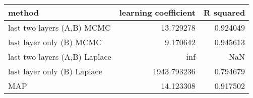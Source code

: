 \begin{tabular}{lrr}
\toprule
                        method &  learning coefficient &  R squared \\
\midrule
    last two layers (A,B) MCMC &             13.729278 &   0.924049 \\
      last layer only (B) MCMC &              9.170642 &   0.945613 \\
 last two layers (A,B) Laplace &                   inf &        NaN \\
   last layer only (B) Laplace &           1943.793236 &   0.794679 \\
                           MAP &             14.123308 &   0.917502 \\
\bottomrule
\end{tabular}
